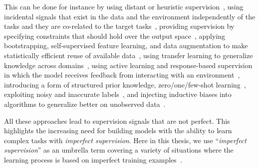 This can be done for instance by
using distant or heuristic supervision~\citep{Deriu2016:SemEval,Severyn:2015:SemEval, Dehghani:2016:SIGIR, dehghani:2018:ICLR, Dehghani:2017:nips_metalearn, Ratner:2016,Rekatsinas:2017,Varma:2017}, 
%
using incidental signals that exist in the data and the environment independently of the tasks and they are co-related to the target tasks~\citep{roth2017incidental}, 
%
providing supervision by specifying constraints that should hold over the output space~\citep{stewart2017label, clarke2010driving}, 
%
applying bootstrapping, self-supervised feature learning, and data augmentation to make statistically efficient reuse of available data~\citep{cubuk2018autoaugment, dosovitskiy2016discriminative,donahue2016adversarial},
%
using transfer learning to generalize knowledge across domains~\citep{Ruder:2019},
%
using active learning and response-based supervision in which the model receives feedback from interacting with an environment~\citep{clarke2010driving,riezler2014response},
%
introducing a form of structured prior knowledge\citep{Dehghani:CIKM2016:long,Dehghani:2016:ICTIR}, 
%
zero/one/few-shot learning~\citep{vinyals2016matching,finn2017model,snell2017prototypical,socher2013zero},
%
exploiting noisy and inaccurate labels~\citep{Vahdat:2017, Lee:2013,Hinton:2015,Brodley:1999,reed2014training, Patrini:2016, patrini2016loss,malach2017decoupling}, 
%
and injecting inductive biases into algorithms to generalize better on unobserved data~\citep{cohen2016group, cohen2016steerable, Dehghani:ICLR:2019}.


All these approaches lead to supervision signals that are not perfect. This highlights the increasing need for building models with the ability to learn complex tasks with \emph{imperfect supervision}. Here in this thesis, we use ``\emph{imperfect supervision}'' as an umbrella term covering a variety of situations where the learning process is based on imperfect training examples~\citep{zhou2018brief}.

